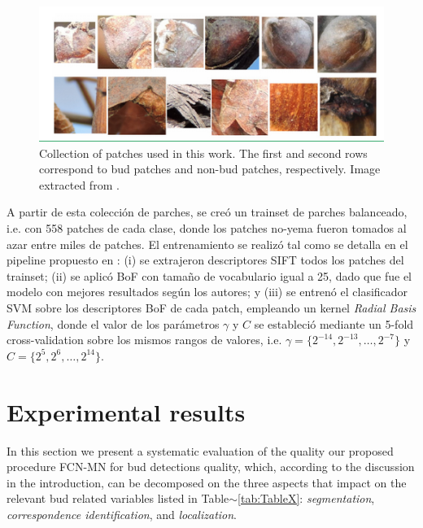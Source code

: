 \documentclass[a4paper,authoryear,review]{elsarticle}
\begin{document}
	
	
	\begin{figure}
		\centering
		\includegraphics[width=12cm]{figures/Figure2.png}
		\caption{Collection of patches used in this work. The first and second rows correspond to bud patches and non-bud patches, respectively. Image extracted from \citet{perez2017image}.}
		\label{fig:Figure2}
	\end{figure}
	
	A partir de esta colección de parches, se creó un trainset de parches balanceado, i.e. con 558 patches de cada clase, donde los patches no-yema fueron tomados al azar entre miles de patches. El entrenamiento se realizó tal como se detalla en el pipeline propuesto en \citet{perez2017image}: (i) se extrajeron descriptores SIFT todos los patches del trainset; (ii) se aplicó BoF con tamaño de vocabulario igual a 25, dado que fue el modelo con mejores resultados según los autores; y (iii) se entrenó el clasificador SVM sobre los descriptores BoF de cada patch, empleando un kernel \emph{Radial Basis Function}, donde el valor de los parámetros $\gamma$ y $C$ se estableció mediante un 5-fold cross-validation sobre los mismos rangos de valores, i.e. $\gamma = \{2^{-14}, 2^{-13}, \ldots, 2^{-7}\}$ y $C = \{2^{5}, 2^{6},\ldots , 2^{14}\}$.
	
	
	\section{Experimental results} \label{sec:results}
	
	In this section we present a systematic evaluation of the quality our proposed procedure FCN-MN for bud detections quality, which, according to the discussion in the introduction, can be decomposed on the three aspects that impact on the relevant bud related variables listed in Table$\sim$\ref{tab:TableX}: \emph{segmentation}, \emph{correspondence identification}, and \emph{localization}. 
	
\end{document}
